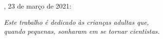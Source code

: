 \documentclass[
	12pt,				%
	oneside,			%
	a4paper,			%
	chapter=TITLE,		%
	english,			%
	brazil				%
	]{abntex2}
\begin{document}

%
% 
%
\begin{folhadeaprovacao}

  \begin{center}
    {\ABNTEXchapterfont\large\MakeUppercase{\imprimirautor}}

    \vspace*{\fill}\vspace*{\fill}
    \begin{center}
      \ABNTEXchapterfont\bfseries\Large\MakeUppercase{\imprimirtitulo}
    \end{center}
    \vspace*{\fill}
    
    \imprimirtextoaprovacao
     
    \vspace*{1cm}
    
	\imprimirlocal, 23 de março de 2021:

    \vspace*{\fill}

   \end{center}
        


      
    \vspace*{1cm}  
  
\end{folhadeaprovacao}

\begin{dedicatoria}
   \vspace*{\fill}
   \begin{flushright}
   \noindent
   \textit{ Este trabalho é dedicado às crianças adultas que,\\
   quando pequenas, sonharam em se tornar cientistas.}\vspace*{2cm}
   \end{flushright}
\end{dedicatoria}
\end{document}
